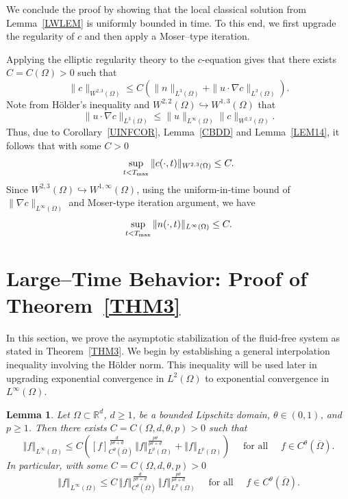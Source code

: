 \documentclass{amsart}
\newtheorem{lemma}[defn]{Lemma}
\numberwithin{equation}{section}
\newcommand{\bke}[1]{\left( #1 \right)}
\newcommand{\norm}[1]{\left\Vert #1 \right\Vert}
\newenvironment{pfthm1}{{\par\noindent\bf
           Proof of Theorem~\ref{THM1}. }}{\hfill\fbox{}\par\vspace{.2cm}}
\begin{document}
We conclude the proof by showing that the local classical solution from Lemma~\ref{LWLEM} is uniformly bounded in time.
To this end, we first upgrade the regularity of $c$ and then apply a Moser--type iteration. 

\medskip 

\begin{pfthm1}
Applying the elliptic regularity theory to the $c$-equation gives that there exists $C=C(\Omega)>0$ such that
\[
\|c\|_{W^{2,3}(\Omega)}\le C\bke{    \|n\|_{L^{3}(\Omega)}+ \|u\cdot \nabla c\|_{L^{3}(\Omega)}          }.
\]
Note from H\"older's inequality and $W^{2,2}(\Omega)\hookrightarrow W^{1,3}(\Omega)$ that
\[
 \|u\cdot \nabla c\|_{L^{3}(\Omega)}  \le \|u\|_{L^{\infty}(\Omega)}\| c\|_{W^{2,2}(\Omega)}.
\]
Thus, due to Corollary~\ref{UINFCOR}, Lemma~\ref{CBDD} and Lemma~\ref{LEM14}, it follows that with some $C>0$
\[
\sup_{t<T_{\rm max}}\| c(\cdot,t)\|_{W^{2,3}(\Omega)}\le C. 
\]
Since $W^{2,3}(\Omega)\hookrightarrow W^{1,\infty}(\Omega)$, using the uniform-in-time bound of $\|\nabla c\|_{L^{\infty}(\Omega)}$ and Moser-type iteration argument, we have 
\[
\sup_{t<T_{\rm max}}\|n(\cdot,t)\|_{L^{\infty}(\Omega)}\le C.
\]
\end{pfthm1}


\section{Large--Time Behavior: Proof of Theorem~\ref{THM3}}\label{S:Asympt}

 
In this section, we prove the asymptotic stabilization of the fluid-free system as stated in Theorem~\ref{THM3}. We begin by establishing a general interpolation inequality involving the H\"older norm. This inequality will be used later in upgrading exponential convergence in $L^2(\Omega)$ to  exponential convergence in $L^{\infty}(\Omega)$.
\begin{lemma}\label{EHRLEM}
Let $\Omega \subset \mathbb{R}^d$, $d\ge1$, be a bounded Lipschitz domain, $\theta \in (0,1)$, and $p \geq 1$. Then there exists $C = C(\Omega, d, \theta, p) > 0$ such that 
\begin{equation}\label{ineq:main}
  \norm{f}_{L^\infty(\Omega)}
  \leq C\left([f]_{C^\theta(\overline\Omega)}^{\,\frac{d}{p\theta + d}}\,\norm{f}_{L^p(\Omega)}^{\frac{p\theta}{p\theta + d}}
  + \norm{f}_{L^p(\Omega)}\right)\quad \mbox{ for all }\quad f \in C^\theta(\overline\Omega).
\end{equation}
In particular, with some $C = C(\Omega, d, \theta, p) > 0$
\begin{equation}\label{ineq:full}
  \norm{f}_{L^\infty(\Omega)}
  \leq C\,\norm{f}_{C^\theta(\overline\Omega)}^{\,\frac{d}{p\theta + d}}\,\norm{f}_{L^p(\Omega)}^{\frac{p\theta}{p\theta + d}}\quad \mbox{ for all }\quad f \in C^\theta(\overline\Omega).
\end{equation}
\end{lemma}
\end{document}

